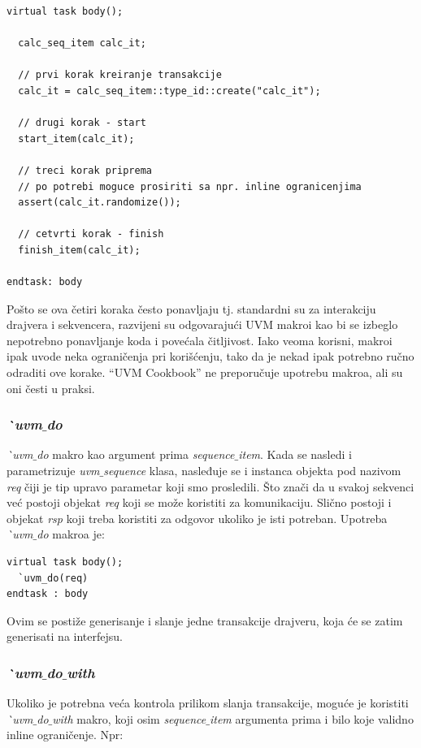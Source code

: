 \begin{lstlisting}
virtual task body();

  calc_seq_item calc_it;

  // prvi korak kreiranje transakcije
  calc_it = calc_seq_item::type_id::create("calc_it");

  // drugi korak - start
  start_item(calc_it);

  // treci korak priprema
  // po potrebi moguce prosiriti sa npr. inline ogranicenjima
  assert(calc_it.randomize());

  // cetvrti korak - finish
  finish_item(calc_it);

endtask: body
\end{lstlisting}

Pošto se ova četiri koraka često ponavljaju tj. standardni su za interakciju
drajvera i sekvencera, razvijeni su odgovarajući UVM makroi kao bi se izbeglo
nepotrebno ponavljanje koda i povećala čitljivost. Iako veoma korisni, makroi
ipak uvode neka ograničenja pri korišćenju, tako da je nekad ipak potrebno ručno
odraditi ove korake. ``UVM Cookbook'' ne preporučuje upotrebu makroa, ali su oni
česti u praksi.

\subsubsection{\emph{\`\ uvm\(\_\)do}}

\emph{\`\ uvm\(\_\)do} makro kao argument prima \emph{sequence\(\_\)item}. Kada se
nasledi i parametrizuje \emph{uvm\(\_\)sequence} klasa, nasleđuje se i instanca
objekta pod nazivom \emph{req} čiji je tip upravo parametar koji smo prosledili.
Što znači da u svakoj sekvenci već postoji objekat \emph{req} koji se može
koristiti za komunikaciju. Slično postoji i objekat \emph{rsp} koji treba
koristiti za odgovor ukoliko je isti potreban. Upotreba \emph{\`\ uvm\(\_\)do}
makroa je:

\begin{lstlisting}
virtual task body();
  `uvm_do(req)
endtask : body
\end{lstlisting}

Ovim se postiže generisanje i slanje jedne transakcije drajveru, koja će se
zatim generisati na interfejsu.

\subsubsection{\emph{\`\ uvm\(\_\)do\(\_\)with}}

Ukoliko je potrebna veća kontrola prilikom slanja transakcije, moguće je
koristiti \emph{\`\ uvm\(\_\)do\(\_\)with} makro, koji osim
\emph{sequence\(\_\)item} argumenta prima i bilo koje validno inline
ograničenje. Npr:

